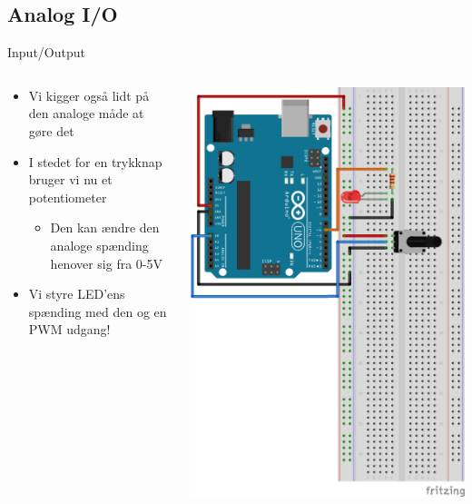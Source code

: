 \documentclass{beamer}
\begin{document}
\subsection{Analog I/O}

\begin{frame}[fragile]{Input/Output}
\begin{columns}
	\begin{column}{0.5\textwidth}
	\begin{itemize}
		\item{Vi kigger også lidt på den analoge måde at gøre det}
		\item{I stedet for en trykknap bruger vi nu et potentiometer}
		\begin{itemize}
			\item{Den kan ændre den analoge spænding henover sig fra 0-5V}
		\end{itemize}
		\item{Vi styre LED'ens spænding med den og en PWM udgang!}
	\end{itemize}
	\end{column}
	\begin{column}{0.5\textwidth}
	\begin{center}
		\includegraphics[width=1\textwidth]{../Examples/3_PotRead/3_PotRead_bb.png}
	\end{center}
	\end{column}
\end{columns}
\end{frame}
\end{document}
